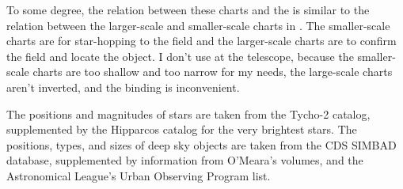 To some degree, the relation between these charts and the {\PSA} is similar to the relation between the larger-scale and smaller-scale charts in . The smaller-scale charts are for star-hopping to the field and the larger-scale charts are to confirm the field and locate the object. I don’t use  at the telescope, because the smaller-scale charts are too shallow and too narrow for my needs, the large-scale charts aren’t inverted, and the binding is inconvenient.

\bigskip

The positions and magnitudes of stars are taken from the Tycho-2 catalog, supplemented by the Hipparcos catalog for the very brightest stars. The positions, types, and sizes of deep sky objects are taken from the CDS SIMBAD database, supplemented by information from O’Meara’s  volumes, and the Astronomical League’s Urban Observing Program list.
